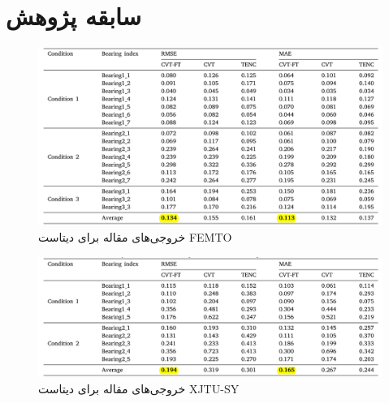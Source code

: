 \documentclass[xcolor=dvipsnames, professionalfonts, aspectratio=169, 11pt]{beamer}
\begin{document}
\begin{persian}
\begin{frame}
\begin{multicols}{2}
	\end{multicols}
	
	
	
	
	
	
	
	
\end{frame}


















\everypar{\rightskip\rightmargin}
\section{سابقه پژوهش}
\begin{frame}
	
	\begin{figure}
		\vspace{0em}
		\includegraphics[height=0.8\textheight]{img/img8.png}
		\caption{خروجی‌های مقاله \cite{wei2024conditional} برای دیتاست FEMTO}
	\end{figure}
\end{frame}



\begin{frame}
	\begin{figure}
		\vspace{0em}
		\includegraphics[height=0.6\textheight]{img/img9.png}
		\caption{خروجی‌های مقاله \cite{wei2024conditional} برای دیتاست XJTU-SY}
	\end{figure}
	

\end{frame}
\end{persian}
\end{document}
